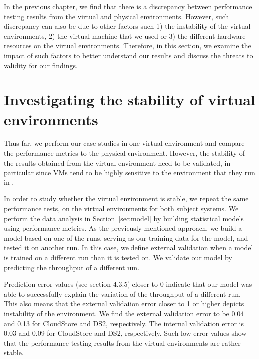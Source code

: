 In the previous chapter, we find that there is a discrepancy between performance testing results from the virtual and physical environments. However, such discrepancy can also be due to other factors such 1) the instability of the virtual environments, 2) the virtual machine that we used or 3) the different hardware resources on the virtual environments. Therefore, in this section, we examine the impact of such factors to better understand our results and discuss the threats to validity for our findings. 


\section{Investigating the stability of virtual environments}

Thus far, we perform our case studies in one virtual environment and compare the performance metrics to the physical environment. However, the stability of the results obtained from the virtual environment need to be validated, in particular since VMs tend to be highly sensitive to the environment that they run in \cite{leitner}.


In order to study whether the virtual environment is stable, we repeat the same performance tests, on the virtual environments for both subject systems. We perform the data analysis in Section~\ref{sec:model} by building statistical models using performance metrics. %
As the previously mentioned approach, we build a model based on one of the runs, serving as our training data for the model, and tested it on another run. In this case, we define external validation when a model is trained on a different run than it is tested on. We validate our model by predicting the throughput of a different run.  

Prediction error values (see section 4.3.5) closer to 0 indicate that our model was able to successfully explain the variation of the throughput of a different run. This also means that the external validation error closer to 1 or higher depicts instability of the environment. We find the external validation error to be 0.04 and 0.13 for CloudStore and DS2, respectively. The internal validation error is 0.03 and 0.09 for CloudStore and DS2, respectively. Such low error values show that the performance testing results from the virtual environments are rather stable. 

